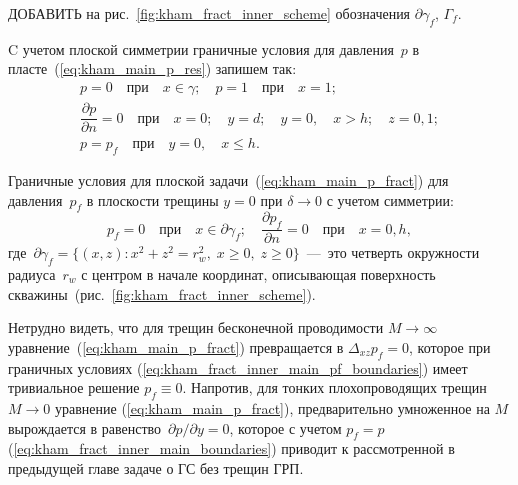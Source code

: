 \documentclass{article}
\begin{document}
\begin{tcolorbox}[colback=yellow!20, colframe=black, coltitle=black, colbacktitle=yellow, title=\textbf{Предупреждение}]
	ДОБАВИТЬ на рис.~\ref{fig:kham_fract_inner_scheme} обозначения $\partial \gamma_f$, $\Gamma_f$.
\end{tcolorbox}

C учетом плоской симметрии граничные условия для давления~$p$ в пласте~(\ref{eq:kham_main_p_res}) запишем так:
\begin{equation}
	\displaystyle
	\begin{gathered}
		p = 0 \quad \text{при} \quad x \in \gamma; \quad p=1 \quad \text{при} \quad x = 1; \\
		\dfrac{\partial p}{\partial n} = 0 \quad \text{при} \quad x=0; \quad
		y = d; \quad y = 0, \quad x > h; \quad z = 0,1; \\
		p = p_f \quad \text{при} \quad y = 0, \quad x \leq h.
	\end{gathered}
	\label{eq:kham_fract_inner_main_boundaries}
\end{equation}

Граничные условия для плоской задачи~(\ref{eq:kham_main_p_fract}) для давления~$p_f$ в
плоскости трещины $y=0$ при $\delta \to 0$ с учетом симметрии:
\begin{equation}
	\displaystyle
	p_f = 0 \quad \text{при} \quad x \in \partial \gamma_f; \quad \dfrac{\partial p_f}{\partial n} = 0 \quad \text{при} \quad x=0, h,
	\label{eq:kham_fract_inner_main_pf_boundaries}
\end{equation}
где~$\partial \gamma_f = \{(x,z): x^2+z^2 = r_w^2,\; x\ge 0,\; z\ge 0\}$~---~это четверть окружности радиуса~$r_w$ с центром в начале координат,
описывающая поверхность скважины~(рис.~\ref{fig:kham_fract_inner_scheme}).

Нетрудно видеть, что для трещин бесконечной проводимости $M \to \infty$ уравнение~(\ref{eq:kham_main_p_fract})
превращается в $\Delta_{xz} p_f = 0$, которое при граничных
условиях (\ref{eq:kham_fract_inner_main_pf_boundaries}) имеет тривиальное решение $p_f \equiv 0$.
Напротив, для тонких плохопроводящих трещин $M \to 0$ уравнение (\ref{eq:kham_main_p_fract}),
предварительно умноженное на $M$ вырождается в равенство~$\partial p/\partial y = 0$, которое
с учетом $p_f = p$ (\ref{eq:kham_fract_inner_main_boundaries}) приводит к рассмотренной в
предыдущей главе задаче о ГС без трещин ГРП.
\end{document}

